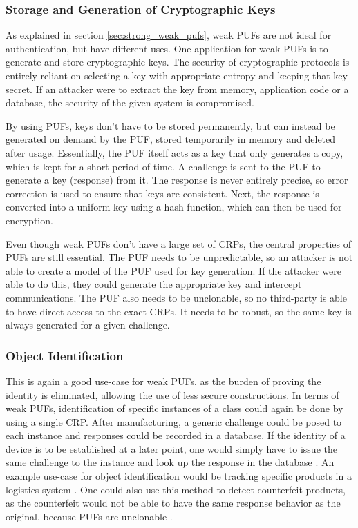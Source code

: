 \subsubsection{Storage and Generation of Cryptographic Keys}

As explained in section \ref{sec:strong_weak_pufs}, weak PUFs are not ideal for authentication, but have different uses.
One application for weak PUFs is to generate and store cryptographic keys.
The security of cryptographic protocols is entirely reliant on selecting a key with appropriate entropy
and keeping that key secret.
If an attacker were to extract the key from memory, application code or a database, the security of the given
system is compromised. \cite[][p. 3f]{McGrath2019}

By using PUFs, keys don't have to be stored permanently, but can instead be generated on demand by the PUF,
stored temporarily in memory and deleted after usage.
Essentially, the PUF itself acts as a key that only generates a copy, which is kept for a short period of time.
A challenge is sent to the PUF to generate a key (response) from it.
The response is never entirely precise, so error correction is used to ensure that keys are consistent.
Next, the response is converted into a uniform key using a hash function, which can then be used for encryption. \cite[][p. 884f]{Katzenbeisser2012}

Even though weak PUFs don't have a large set of \acp{CRP}, the central properties of PUFs are still essential.
The PUF needs to be unpredictable, so an attacker is not able to create a model
of the PUF used for key generation. If the attacker were able to do this, they could generate the appropriate
key and intercept communications.
The PUF also needs to be unclonable, so no third-party is able to have direct access to the exact \acp{CRP}.
It needs to be robust, so the same key is always generated for a given challenge. \cite[][p. 885]{Katzenbeisser2012}

\subsubsection{Object Identification}

This is again a good use-case for weak PUFs, as the burden of proving the identity is eliminated,
allowing the use of less secure constructions.
In terms of weak PUFs, identification of specific instances of a class could again be done by using a single \ac{CRP}.
After manufacturing, a generic challenge could be posed to each instance and responses could be recorded in a database.
If the identity of a device is to be established at a later point, one would simply have to issue the same challenge
to the instance and look up the response in the database \cite[][p. 118]{Maes2013}.
An example use-case for object identification would be tracking specific products in a logistics system \cite[][p. 118]{Maes2013}.
One could also use this method to detect counterfeit products, as the counterfeit would not be able to have the same
response behavior as the original, because PUFs are unclonable \cite[][p. 884]{Katzenbeisser2012}.


